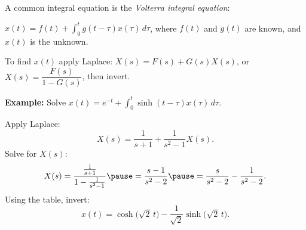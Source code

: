 \documentclass[10pt,aspectratio=169]{beamer}
\begin{document}
\begin{frame}
A common integral equation
is the \emph{Volterra integral equation}:

\medskip

\quad
$\displaystyle
x(t) = f(t) + \int_0^t g(t-\tau) x(\tau) \, d\tau$,
\quad 
where $f(t)$ and $g(t)$ are known,
and $x(t)$ is the unknown.

\medskip
\pause

To find $x(t)$ apply Laplace:
\quad
$X(s) = F(s) + G(s) X(s)$,
\pause
\quad
or
\quad
$X(s) = \dfrac{F(s)}{1-G(s)}$, \pause \quad then invert.

\medskip
\pause

\textbf{Example:}
Solve
\quad
$\displaystyle
x(t) =  e^{-t} + \int_0^t \sinh(t-\tau) x(\tau) \, d\tau$.

\medskip
\pause

Apply Laplace:
\[
X(s) = \frac{1}{s+1} + \frac{1}{s^2-1} X(s) .
\]
\pause
Solve for $X(s)$:
\[
X(s) = \frac{\frac{1}{s+1}}{1- \frac{1}{s^2-1}}
\pause
=
\frac{s-1}{s^2 - 2}
\pause
=
\frac{s}{s^2 - 2}
-
\frac{1}{s^2 - 2} .
\]
\pause
Using the table, invert:
\[
x(t) = \cosh \bigl( \sqrt{2} \, t \bigr) -
\frac{1}{\sqrt{2}} \sinh \bigl( \sqrt{2}\, t \bigr).
\]

\end{frame}
\end{document}
